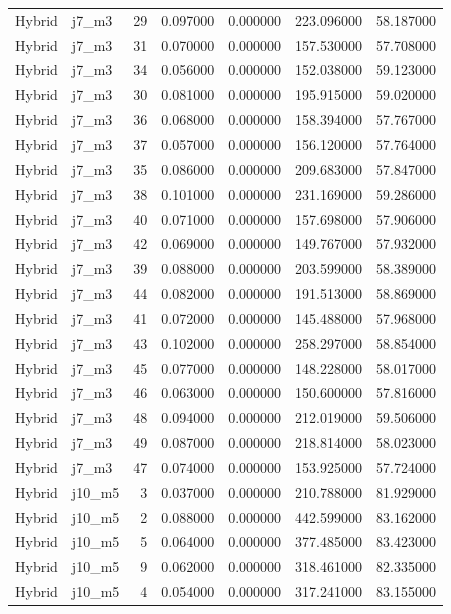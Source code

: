 \begin{tabular}{llrrrrr}
Hybrid & j7_m3 & 29 & 0.097000 & 0.000000 & 223.096000 & 58.187000 \\
Hybrid & j7_m3 & 31 & 0.070000 & 0.000000 & 157.530000 & 57.708000 \\
Hybrid & j7_m3 & 34 & 0.056000 & 0.000000 & 152.038000 & 59.123000 \\
Hybrid & j7_m3 & 30 & 0.081000 & 0.000000 & 195.915000 & 59.020000 \\
Hybrid & j7_m3 & 36 & 0.068000 & 0.000000 & 158.394000 & 57.767000 \\
Hybrid & j7_m3 & 37 & 0.057000 & 0.000000 & 156.120000 & 57.764000 \\
Hybrid & j7_m3 & 35 & 0.086000 & 0.000000 & 209.683000 & 57.847000 \\
Hybrid & j7_m3 & 38 & 0.101000 & 0.000000 & 231.169000 & 59.286000 \\
Hybrid & j7_m3 & 40 & 0.071000 & 0.000000 & 157.698000 & 57.906000 \\
Hybrid & j7_m3 & 42 & 0.069000 & 0.000000 & 149.767000 & 57.932000 \\
Hybrid & j7_m3 & 39 & 0.088000 & 0.000000 & 203.599000 & 58.389000 \\
Hybrid & j7_m3 & 44 & 0.082000 & 0.000000 & 191.513000 & 58.869000 \\
Hybrid & j7_m3 & 41 & 0.072000 & 0.000000 & 145.488000 & 57.968000 \\
Hybrid & j7_m3 & 43 & 0.102000 & 0.000000 & 258.297000 & 58.854000 \\
Hybrid & j7_m3 & 45 & 0.077000 & 0.000000 & 148.228000 & 58.017000 \\
Hybrid & j7_m3 & 46 & 0.063000 & 0.000000 & 150.600000 & 57.816000 \\
Hybrid & j7_m3 & 48 & 0.094000 & 0.000000 & 212.019000 & 59.506000 \\
Hybrid & j7_m3 & 49 & 0.087000 & 0.000000 & 218.814000 & 58.023000 \\
Hybrid & j7_m3 & 47 & 0.074000 & 0.000000 & 153.925000 & 57.724000 \\
Hybrid & j10_m5 & 3 & 0.037000 & 0.000000 & 210.788000 & 81.929000 \\
Hybrid & j10_m5 & 2 & 0.088000 & 0.000000 & 442.599000 & 83.162000 \\
Hybrid & j10_m5 & 5 & 0.064000 & 0.000000 & 377.485000 & 83.423000 \\
Hybrid & j10_m5 & 9 & 0.062000 & 0.000000 & 318.461000 & 82.335000 \\
Hybrid & j10_m5 & 4 & 0.054000 & 0.000000 & 317.241000 & 83.155000 \\

\end{tabular}
